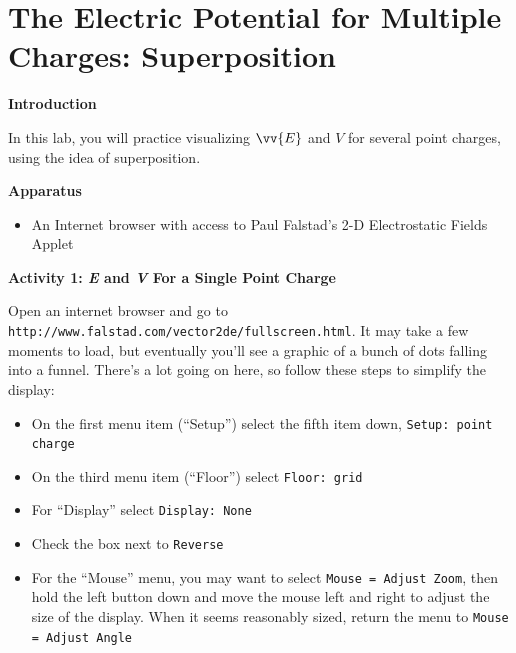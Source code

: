 \section{The Electric Potential for Multiple Charges: Superposition}
\label{potential_superposition}

\makelabheader %

\bigskip

\textbf{Introduction} 

In this lab, you will practice visualizing $\vv{E}$ and $V$ for several point charges, using the idea of superposition.

\textbf{Apparatus}

\begin{itemize}[nosep]
\item An Internet browser with access to Paul Falstad's 2-D Electrostatic Fields Applet
\end{itemize}

\bigskip

\textbf{Activity 1: \textit{E} and \textit{V} For a Single Point Charge}

Open an internet browser and go to \verb!http://www.falstad.com/vector2de/fullscreen.html!.  It may take a few moments to load, but eventually you'll see a graphic of a bunch of dots falling into a funnel.  There's a lot going on here, so follow these steps to simplify the display:
\begin{itemize}[nosep]
\item On the first menu item (``Setup'') select the fifth item down, \verb!Setup: point charge!
\item On the third menu item (``Floor'') select \verb!Floor: grid!
\item For ``Display'' select \verb!Display: None!
\item Check the box next to \verb!Reverse!
\item For the ``Mouse'' menu, you may want to select \verb!Mouse = Adjust Zoom!, then hold the left button down and move the mouse left and right to adjust the size of the display.  When it seems reasonably sized, return the menu to \verb!Mouse = Adjust Angle!
\end{itemize}

